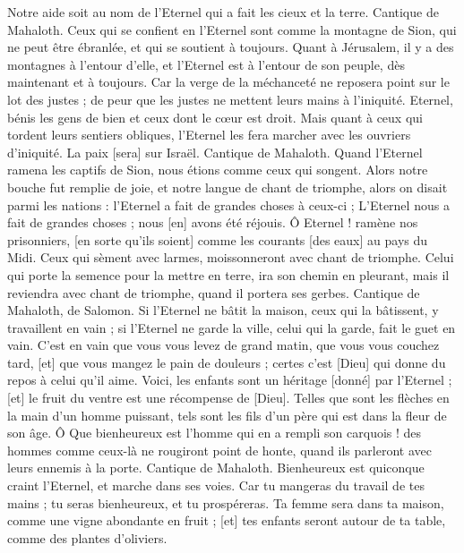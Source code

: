 \begin{multicols}{2}
Notre aide soit au nom de l'Eternel qui a fait les cieux et la terre.
\VerseOne{}Cantique de Mahaloth. Ceux qui se confient en l'Eternel sont comme la montagne de Sion, qui ne peut être ébranlée, et qui se soutient à toujours.
Quant à Jérusalem, il y a des montagnes à l'entour d'elle, et l'Eternel est à l'entour de son peuple, dès maintenant et à toujours.
Car la verge de la méchanceté ne reposera point sur le lot des justes ; de peur que les justes ne mettent leurs mains à l'iniquité.
Eternel, bénis les gens de bien et ceux dont le cœur est droit.
Mais quant à ceux qui tordent leurs sentiers obliques, l'Eternel les fera marcher avec les ouvriers d'iniquité. La paix [sera] sur Israël.
\VerseOne{}Cantique de Mahaloth. Quand l'Eternel ramena les captifs de Sion, nous étions comme ceux qui songent.
Alors notre bouche fut remplie de joie, et notre langue de chant de triomphe, alors on disait parmi les nations : l'Eternel a fait de grandes choses à ceux-ci ;
L'Eternel nous a fait de grandes choses ; nous [en] avons été réjouis.
Ô Eternel ! ramène nos prisonniers, [en sorte qu'ils soient] comme les courants [des eaux] au pays du Midi.
Ceux qui sèment avec larmes, moissonneront avec chant de triomphe.
Celui qui porte la semence pour la mettre en terre, ira son chemin en pleurant, mais il reviendra avec chant de triomphe, quand il portera ses gerbes.
\VerseOne{}Cantique de Mahaloth, de Salomon. Si l'Eternel ne bâtit la maison, ceux qui la bâtissent, y travaillent en vain ; si l'Eternel ne garde la ville, celui qui la garde, fait le guet en vain.
C'est en vain que vous vous levez de grand matin, que vous vous couchez tard, [et] que vous mangez le pain de douleurs ; certes c'est [Dieu] qui donne du repos à celui qu'il aime.
Voici, les enfants sont un héritage [donné] par l'Eternel ; [et] le fruit du ventre est une récompense de [Dieu].
Telles que sont les flèches en la main d'un homme puissant, tels sont les fils d'un père qui est dans la fleur de son âge.
Ô Que bienheureux est l'homme qui en a rempli son carquois ! des hommes comme ceux-là ne rougiront point de honte, quand ils parleront avec leurs ennemis à la porte.
\VerseOne{}Cantique de Mahaloth. Bienheureux est quiconque craint l'Eternel, et marche dans ses voies.
Car tu mangeras du travail de tes mains ; tu seras bienheureux, et tu prospéreras.
Ta femme sera dans ta maison, comme une vigne abondante en fruit ; [et] tes enfants seront autour de ta table, comme des plantes d'oliviers.

\end{multicols}

